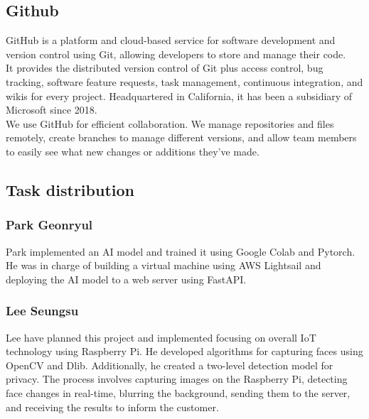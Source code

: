 \subsection{\textbf{Github}}
\cite{github} GitHub is a platform and cloud-based service for software development and version control using Git, allowing developers to store and manage their code. 
\\

It provides the distributed version control of Git plus access control, bug tracking, software feature requests, task management, continuous integration, and wikis for every project. Headquartered in California, it has been a subsidiary of Microsoft since 2018.
\\

We use GitHub for efficient collaboration. We manage repositories and files remotely, create branches to manage different versions, and allow team members to easily see what new changes or additions they've made.\\


\subsection{\textbf{Task distribution}}
\subsubsection{\textbf{Park Geonryul}}
Park implemented an AI model and trained it using Google Colab and Pytorch. He was in charge of building a virtual machine using AWS Lightsail and deploying the AI model to a web server using FastAPI.\\

\subsubsection{\textbf{Lee Seungsu}}
Lee have planned this project and implemented focusing on overall IoT technology using Raspberry Pi. He developed algorithms for capturing faces using OpenCV and Dlib. Additionally, he created a two-level detection model for privacy. The process involves capturing images on the Raspberry Pi, detecting face changes in real-time, blurring the background, sending them to the server, and receiving the results to inform the customer.\\
